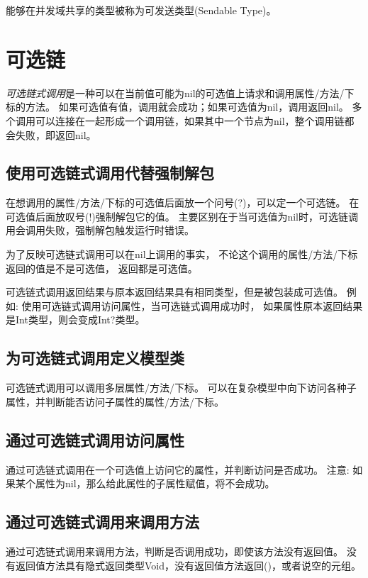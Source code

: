 \documentclass{../main.tex}{subfiles}
\begin{document}
能够在并发域共享的类型被称为可发送类型(Sendable Type)。

\section{可选链}
\emph{可选链式调用}是一种可以在当前值可能为nil的可选值上请求和调用属性/方法/下标的方法。
如果可选值有值，调用就会成功；如果可选值为nil，调用返回nil。
多个调用可以连接在一起形成一个调用链，如果其中一个节点为nil，整个调用链都会失败，即返回nil。



\subsection{使用可选链式调用代替强制解包}
在想调用的属性/方法/下标的可选值后面放一个问号(?)，可以定一个可选链。
在可选值后面放叹号(!)强制解包它的值。
主要区别在于当可选值为nil时，可选链调用会调用失败，强制解包触发运行时错误。

为了反映可选链式调用可以在nil上调用的事实，
不论这个调用的属性/方法/下标返回的值是不是可选值，
返回都是可选值。

可选链式调用返回结果与原本返回结果具有相同类型，但是被包装成可选值。
例如: 使用可选链式调用访问属性，当可选链式调用成功时，
如果属性原本返回结果是Int类型，则会变成Int?类型。

\subsection{为可选链式调用定义模型类}
可选链式调用可以调用多层属性/方法/下标。
可以在复杂模型中向下访问各种子属性，并判断能否访问子属性的属性/方法/下标。

\subsection{通过可选链式调用访问属性}
通过可选链式调用在一个可选值上访问它的属性，并判断访问是否成功。
注意: 如果某个属性为nil，那么给此属性的子属性赋值，将不会成功。

\subsection{通过可选链式调用来调用方法}
通过可选链式调用来调用方法，判断是否调用成功，即使该方法没有返回值。
没有返回值方法具有隐式返回类型Void，没有返回值方法返回()，或者说空的元组。
\end{document}

